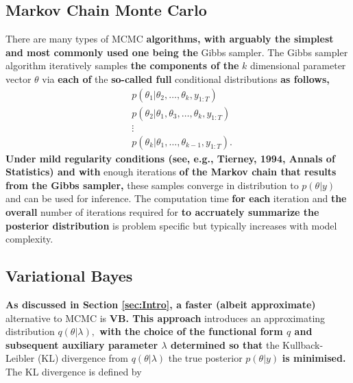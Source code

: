 \documentclass[12pt,a4paper]{article}%
\numberwithin{equation}{section}
\begin{document}
\subsection{Markov Chain Monte Carlo}

There are many types of MCMC {\bf algorithms, with arguably the simplest and most commonly used one being the} Gibbs sampler. {The Gibbs sampler algorithm} iteratively samples {\bf the components of the} $k$ dimensional parameter vector $\theta$ via {\bf each of} the {\bf so-called full} conditional distributions {\bf as follows,}
\begin{align}
&p(\theta_1 | \theta_2, \dots, \theta_k, y_{1:T}) \nonumber \\
&p(\theta_2 | \theta_1, \theta_3, \dots, \theta_k, y_{1:T}) \nonumber \\
&\vdots \nonumber \\
&p(\theta_k | \theta_1, \dots, \theta_{k-1}, y_{1:T}). \nonumber
\end{align}
{\bf Under mild regularity conditions (see, e.g., Tierney, 1994, Annals of Statistics) and with} enough iterations {\bf of the Markov chain that results from the Gibbs sampler,} these samples converge in distribution to $p(\theta | y)$ and can be used for inference. 
The computation time {\bf for each} iteration and {\bf the overall} number of iterations required for {\bf to accruately summarize the posterior distribution} is problem specific but typically increases with model complexity. 


\subsection{Variational Bayes}

{\bf As discussed in Section \ref{sec:Intro}, a faster (albeit approximate)} alternative to MCMC is {\bf VB. This approach} introduces an approximating distribution {\bf $q(\theta | \lambda),$ with the choice of the functional form $q$ and subsequent auxiliary parameter $\lambda$ determined so that} the Kullback-Leibler (KL) divergence \citep{Kullback1951} from $q(\theta | \lambda)$ the true posterior $p(\theta | y)$ {\bf is minimised.} The KL divergence is defined by
\end{document}
